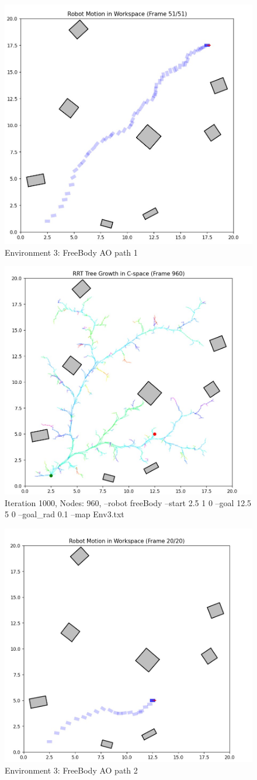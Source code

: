 \documentclass{article}
\begin{document}
\begin{figure} [H]
    \centering
    \includegraphics[width=0.5\linewidth]{latex_media/Env3AORobotPathFB1.jpg}
    \caption{Environment 3: FreeBody AO path 1}
\end{figure}

\begin{figure} [H]
    \centering
    \includegraphics[width=0.5\linewidth]{latex_media/Env3AORobotPathFB2.jpg}
    \caption{Iteration 1000, Nodes: 960, --robot freeBody --start 2.5 1 0 --goal 12.5 5 0 --goal\_rad 0.1 --map Env3.txt}
\end{figure}

\begin{figure} [H]
    \centering
    \includegraphics[width=0.5\linewidth]{latex_media/Env3AOTreeGrowthFB2.jpg}
    \caption{Environment 3: FreeBody AO path 2}
\end{figure}
\end{document}
